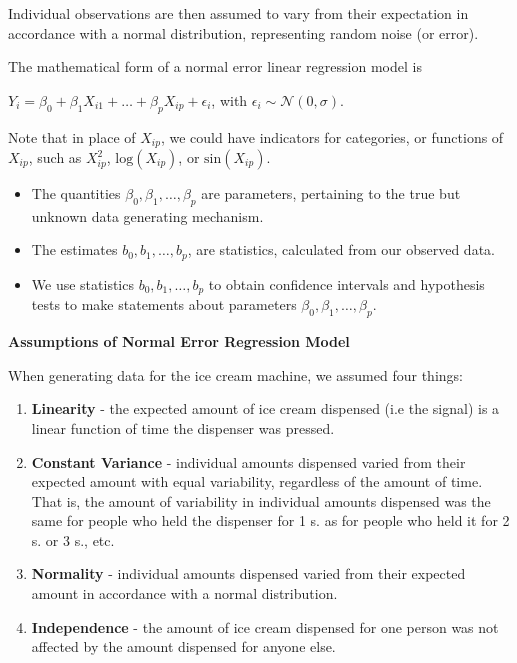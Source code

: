 \documentclass[
  letterpaper,
  DIV=11,
  numbers=noendperiod]{scrreprt}
\begin{document}
Individual observations are then assumed to vary from their expectation
in accordance with a normal distribution, representing random noise (or
error).

The mathematical form of a normal error linear regression model is

\(Y_i = \beta_0 + \beta_1X_{i1}+ \ldots + \beta_pX_{ip} + \epsilon_i\),
with \(\epsilon_i\sim\mathcal{N}(0,\sigma)\).

Note that in place of \(X_{ip}\), we could have indicators for
categories, or functions of \(X_{ip}\), such as \(X_{ip}^2\),
\(\text{log}(X_{ip})\), or \(\text{sin}(X_{ip})\).

\begin{itemize}
\item
  The quantities \(\beta_0, \beta_1, \ldots, \beta_p\) are parameters,
  pertaining to the true but unknown data generating mechanism.
\item
  The estimates \(b_0, b_1, \ldots, b_p\), are statistics, calculated
  from our observed data.\\
\item
  We use statistics \(b_0, b_1, \ldots, b_p\) to obtain confidence
  intervals and hypothesis tests to make statements about parameters
  \(\beta_0, \beta_1, \ldots, \beta_p\).
\end{itemize}

\textbf{Assumptions of Normal Error Regression Model}

When generating data for the ice cream machine, we assumed four things:

\begin{enumerate}
\def\labelenumi{\arabic{enumi}.}
\item
  \textbf{Linearity} - the expected amount of ice cream dispensed (i.e
  the signal) is a linear function of time the dispenser was pressed.
\item
  \textbf{Constant Variance} - individual amounts dispensed varied from
  their expected amount with equal variability, regardless of the amount
  of time. That is, the amount of variability in individual amounts
  dispensed was the same for people who held the dispenser for 1 s. as
  for people who held it for 2 s. or 3 s., etc.
\item
  \textbf{Normality} - individual amounts dispensed varied from their
  expected amount in accordance with a normal distribution.
\item
  \textbf{Independence} - the amount of ice cream dispensed for one
  person was not affected by the amount dispensed for anyone else.
\end{enumerate}
\end{document}
